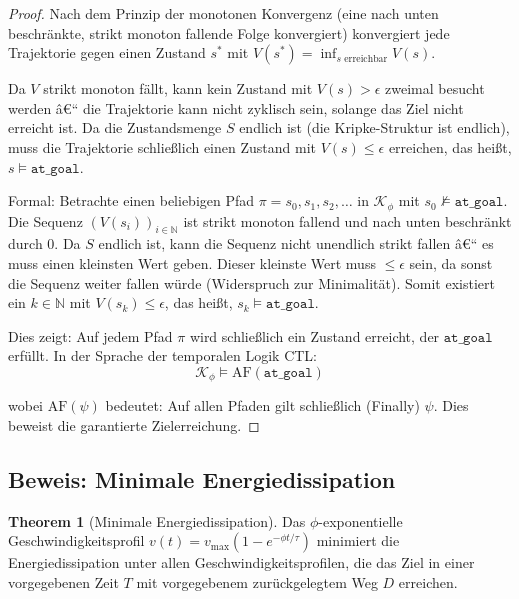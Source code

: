 ﻿\documentclass[a4paper,12pt]{article}
\theoremstyle{definition}
\newtheorem{theorem}{Theorem}[section]
\begin{document}
\begin{proof}
Nach dem Prinzip der monotonen Konvergenz (eine nach unten beschränkte, strikt monoton fallende Folge konvergiert) konvergiert jede Trajektorie gegen einen Zustand $s^*$ mit $V(s^*) = \inf_{s \text{ erreichbar}} V(s)$.

Da $V$ strikt monoton fällt, kann kein Zustand mit $V(s) > \epsilon$ zweimal besucht werden â€“ die Trajektorie kann nicht zyklisch sein, solange das Ziel nicht erreicht ist. Da die Zustandsmenge $S$ endlich ist (die Kripke-Struktur ist endlich), muss die Trajektorie schließlich einen Zustand mit $V(s) \leq \epsilon$ erreichen, das heißt, $s \models \texttt{at\_goal}$.

Formal: Betrachte einen beliebigen Pfad $\pi = s_0, s_1, s_2, \ldots$ in $\mathcal{K}_{\phi}$ mit $s_0 \not\models \texttt{at\_goal}$. Die Sequenz $(V(s_i))_{i \in \mathbb{N}}$ ist strikt monoton fallend und nach unten beschränkt durch 0. Da $S$ endlich ist, kann die Sequenz nicht unendlich strikt fallen â€“ es muss einen kleinsten Wert geben. Dieser kleinste Wert muss $\leq \epsilon$ sein, da sonst die Sequenz weiter fallen würde (Widerspruch zur Minimalität). Somit existiert ein $k \in \mathbb{N}$ mit $V(s_k) \leq \epsilon$, das heißt, $s_k \models \texttt{at\_goal}$.

Dies zeigt: Auf jedem Pfad $\pi$ wird schließlich ein Zustand erreicht, der $\texttt{at\_goal}$ erfüllt. In der Sprache der temporalen Logik CTL:
\begin{equation}
\mathcal{K}_{\phi} \models \text{AF}(\texttt{at\_goal})
\end{equation}

wobei $\text{AF}(\psi)$ bedeutet: Auf allen Pfaden gilt schließlich (Finally) $\psi$. Dies beweist die garantierte Zielerreichung.
\end{proof}

\subsection{Beweis: Minimale Energiedissipation}

\begin{theorem}[Minimale Energiedissipation]
Das $\phi$-exponentielle Geschwindigkeitsprofil $v(t) = v_{\max}(1 - e^{-\phi t/\tau})$ minimiert die Energiedissipation unter allen Geschwindigkeitsprofilen, die das Ziel in einer vorgegebenen Zeit $T$ mit vorgegebenem zurückgelegtem Weg $D$ erreichen.
\end{theorem}
\end{document}

